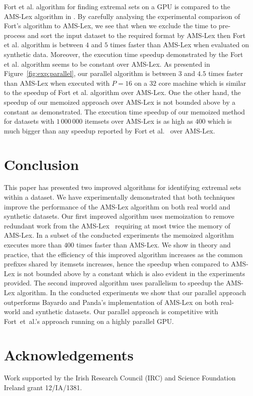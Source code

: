 \documentclass[13pt,a4paper]{article}
\begin{document}
Fort et al. algorithm for finding extremal sets on a GPU is compared to the AMS-Lex algorithm in \cite{Fort+13}. By carefully analysing the experimental comparison of Fort's algorithm to AMS-Lex, we see that when we exclude the time to pre-process and sort the input dataset to the required format by AMS-Lex then Fort et al. algorithm is between $4$ and $5$ times faster than AMS-Lex when evaluated on synthetic data. Moreover, the execution time speedup demonstrated by the Fort et al. algorithm seems to be constant over AMS-Lex. As presented in Figure~\ref{fig:exp:parallel}, our parallel algorithm is between $3$ and $4.5$ times faster than AMS-Lex when executed with $P = 16$ on a $32$ core machine which is similar to the speedup of Fort et al. algorithm over AMS-Lex. One the other hand, the speedup of our memoized approach over AMS-Lex is not bounded above by a constant as demonstrated. The execution time speedup of our memoized method for datasets with $1\,000\,000$ itemsets over AMS-Lex is as high as $400$ which is much bigger than any speedup reported by Fort et al.~\cite{Fort+13} over AMS-Lex. 



\section{Conclusion}
\label{sec:conclusion}

This paper has presented two improved algorithms for identifying extremal sets within a dataset. We have experimentally demonstrated that both techniques improve the performance of the AMS-Lex algorithm on both real world and synthetic datasets. Our first improved algorithm uses memoization to remove redundant work from the AMS-Lex~\cite{BayardoPanda11} requiring at most twice the memory of AMS-Lex. In a subset of the conducted experiments the memoized algorithm executes more than $400$ times faster than AMS-Lex. We show in theory and practice, that the efficiency of this improved algorithm increases as the common prefixes shared by itemsets increases, hence the speedup when compared to AMS-Lex is not bounded above by a constant which is also evident in the experiments provided. The second improved algorithm uses parallelism to speedup the AMS-Lex algorithm. In the conducted experiments we show that our parallel approach outperforms Bayardo and Panda's implementation of AMS-Lex on both real-world and synthetic datasets. Our parallel approach is competitive with Fort~et~al.'s approach running on a highly parallel GPU.


\section{Acknowledgements}
Work supported by the Irish Research Council (IRC) and Science Foundation Ireland grant 12/IA/1381.







\end{document}
